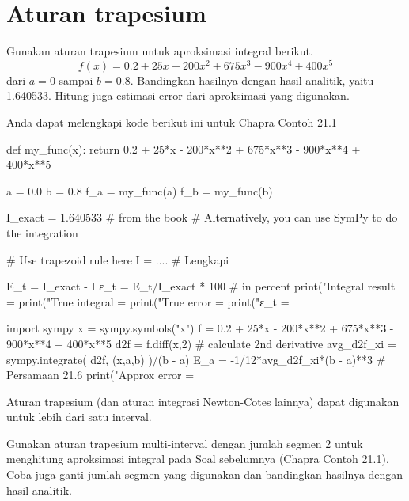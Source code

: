 \section{Aturan trapesium}

\begin{soal}
Gunakan aturan trapesium untuk aproksimasi integral berikut.
\begin{equation*}
f(x) = 0.2 + 25x - 200x^2 + 675x^3 - 900x^4 + 400x^5
\end{equation*}
dari $a = 0$ sampai $b = 0.8$. Bandingkan hasilnya dengan hasil analitik,
yaitu 1.640533. Hitung juga estimasi error dari aproksimasi yang digunakan.
\end{soal}

Anda dapat melengkapi kode berikut ini untuk Chapra Contoh 21.1
\begin{pythoncode}
def my_func(x):
    return 0.2 + 25*x - 200*x**2 + 675*x**3 - 900*x**4 + 400*x**5

a = 0.0
b = 0.8
f_a = my_func(a)
f_b = my_func(b)

I_exact = 1.640533 # from the book
# Alternatively, you can use SymPy to do the integration

# Use trapezoid rule here
I = .... # Lengkapi

E_t = I_exact - I
ε_t = E_t/I_exact * 100 # in percent
print("Integral result = %
print("True integral   = %
print("True error      = %
print("ε_t             = %

import sympy
x = sympy.symbols("x")
f = 0.2 + 25*x - 200*x**2 + 675*x**3 - 900*x**4 + 400*x**5
d2f = f.diff(x,2) # calculate 2nd derivative
avg_d2f_xi = sympy.integrate( d2f, (x,a,b) )/(b - a)
E_a = -1/12*avg_d2f_xi*(b - a)**3 # Persamaan 21.6
print("Approx error    = %
\end{pythoncode}

Aturan trapesium (dan aturan integrasi Newton-Cotes lainnya) dapat digunakan
untuk lebih dari satu interval.

\begin{soal}
Gunakan aturan trapesium multi-interval dengan jumlah segmen 2 untuk menghitung
aproksimasi integral pada Soal sebelumnya (Chapra Contoh 21.1).
Coba juga ganti jumlah segmen yang digunakan dan bandingkan hasilnya
dengan hasil analitik.
\end{soal}

